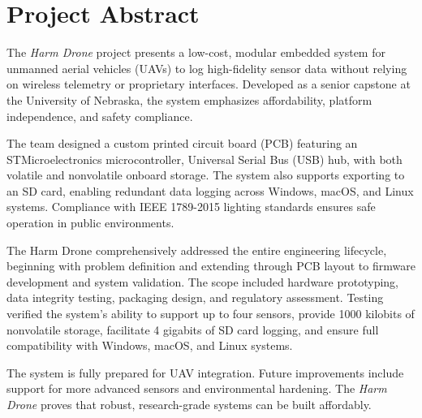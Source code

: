 \documentclass[../main.tex]{subfiles}
\begin{document}
\section*{Project Abstract}

\par The \textit{Harm Drone} project presents a low-cost, modular embedded system for unmanned aerial vehicles (UAVs) to log high-fidelity sensor data without relying on wireless telemetry or proprietary interfaces. Developed as a senior capstone at the University of Nebraska, the system emphasizes affordability, platform independence, and safety compliance.

\par The team designed a custom printed circuit board (PCB) featuring an STMicroelectronics microcontroller, Universal Serial Bus (USB) hub, with both volatile and nonvolatile onboard storage. The system also supports exporting to an SD card, enabling redundant data logging across Windows, macOS, and Linux systems. Compliance with IEEE 1789-2015 lighting standards ensures safe operation in public environments.

\par The Harm Drone comprehensively addressed the entire engineering lifecycle, beginning with problem definition and extending through PCB layout to firmware development and system validation. The scope included hardware prototyping, data integrity testing, packaging design, and regulatory assessment. Testing verified the system's ability to support up to four sensors, provide 1000 kilobits of nonvolatile storage, facilitate 4 gigabits of SD card logging, and ensure full compatibility with Windows, macOS, and Linux systems.

\par The system is fully prepared for UAV integration. Future improvements include support for more advanced sensors and environmental hardening. The \textit{Harm Drone} proves that robust, research-grade systems can be built affordably.
\end{document}
